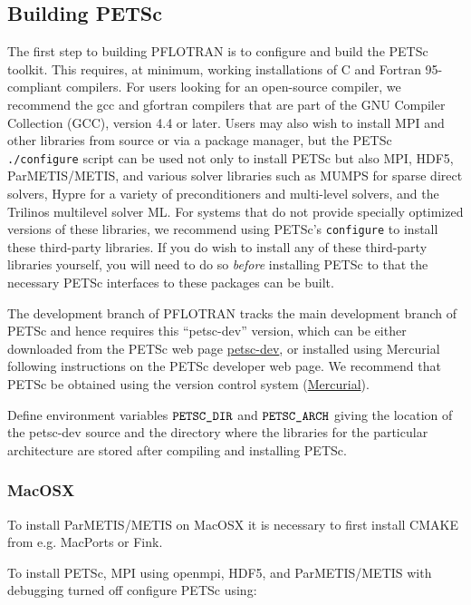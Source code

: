 \subsection{Building PETSc}

The first step to building PFLOTRAN is to configure and build the PETSc 
toolkit.
This requires, at minimum, working installations of C and Fortran 95-compliant 
compilers.
For users looking for an open-source compiler, we recommend the gcc and 
gfortran compilers that are part of the GNU Compiler Collection (GCC), version 
4.4 or later.
Users may also wish to install MPI and other libraries from source or via a 
package manager, but the PETSc {\tt ./configure} script can be used not only 
to install PETSc but also MPI, HDF5, ParMETIS/METIS, and various solver 
libraries such as MUMPS for sparse direct solvers, Hypre for a variety of 
preconditioners and multi-level solvers, and the Trilinos multilevel solver ML. 
For systems that do not provide specially optimized versions of these 
libraries, we recommend using PETSc's {\tt configure} to install these 
third-party libraries.
If you do wish to install any of these third-party libraries yourself, you 
will need to do so {\it before} installing PETSc to that the necessary PETSc 
interfaces to these packages can be built.

The development branch of PFLOTRAN tracks the main development branch of 
PETSc and hence requires this ``petsc-dev'' version, which can be either 
downloaded from the PETSc web page 
\href{http://www.mcs.anl.gov/petsc/developers/index.html}{petsc-dev}, 
or installed using Mercurial following instructions on the PETSc developer web 
page. 
We recommend that PETSc be obtained using the version control system  
(\href{http://mercurial.selenic.com/wiki}{Mercurial}).

Define environment variables $\verb|PETSC_DIR|$ and $\verb|PETSC_ARCH|$ giving the location of the petsc-dev source and the directory where the libraries for the particular architecture are stored after compiling and installing PETSc.

\subsubsection{MacOSX}

To install ParMETIS/METIS on MacOSX it is necessary to first install CMAKE from e.g. MacPorts or Fink.

To install PETSc, MPI using openmpi, HDF5, and ParMETIS/METIS with debugging turned off configure PETSc using:

